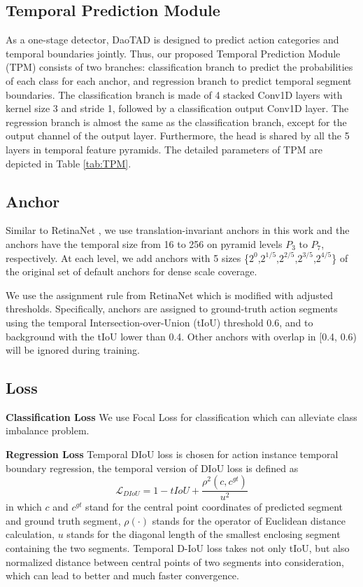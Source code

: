 \documentclass[final]{cvpr}
\begin{document}
\subsection{Temporal Prediction Module}
As a one-stage detector, DaoTAD is designed to predict action categories and temporal boundaries jointly. Thus, our proposed Temporal Prediction Module (TPM) consists of two branches: classification branch to predict the probabilities of each class for each anchor, and regression branch to predict temporal segment boundaries. The classification branch is made of 4 stacked Conv1D layers with kernel size 3 and stride 1, followed by a classification output Conv1D layer. The regression branch is almost the same as the classification branch, except for the output channel of the output layer. Furthermore, the head is shared by all the 5 layers in temporal feature pyramids. The detailed parameters of TPM are depicted in Table \ref{tab:TPM}.

\subsection{Anchor}
Similar to RetinaNet \cite{lin2017focal}, we use translation-invariant anchors in this work and the anchors have the temporal size from 16 to 256 on pyramid levels $P_3$ to $P_7$, respectively. At each level, we add anchors with 5 sizes \{$2^0$,$2^{1/5}$,$2^{2/5}$,$2^{3/5}$,$2^{4/5}$\} of the original set of default anchors for dense scale coverage. 

We use the assignment rule from RetinaNet \cite{lin2017focal} which is modified with adjusted thresholds. Specifically, anchors are assigned to ground-truth action segments using the temporal Intersection-over-Union (tIoU) threshold 0.6, and to background with the tIoU lower than 0.4. Other anchors with overlap in [0.4, 0.6) will be ignored during training.

\subsection{Loss}
\textbf{Classification Loss} We use Focal Loss \cite{lin2017focal} for classification which can alleviate class imbalance problem. 

\textbf{Regression Loss} Temporal DIoU loss is chosen for action instance temporal boundary regression, the temporal version of DIoU loss \cite{zheng2020distance} is defined as 
\begin{equation}
\mathcal{L}_{DIoU} = 1 - tIoU + \frac{\rho^{2} (c, c^{gt})}{u^{2}}
\end{equation}
in which $c$ and $c^{gt}$ stand for the central point coordinates of predicted segment and ground truth segment, $\rho(\cdot )$ stands for the operator of Euclidean distance calculation, $u$ stands for the diagonal length of the smallest enclosing segment containing the two segments. Temporal D-IoU loss takes not only tIoU, but also normalized distance between central points of two segments into consideration, which can lead to better and much faster convergence.
\end{document}
